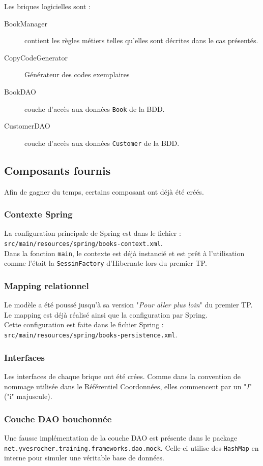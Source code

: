 \documentclass[small,algo]{dushClass}
\begin{document}
Les briques logicielles sont :
\begin{description}
\item[BookManager] contient les règles métiers telles qu'elles sont décrites dans le cas présentés.
\item[CopyCodeGenerator] Générateur des codes exemplaires
\item[BookDAO] couche d'accès aux données \texttt{Book} de la BDD.
\item[CustomerDAO] couche d'accès aux données \texttt{Customer} de la BDD.
\end{description}


\subsection{Composants fournis}
Afin de gagner du temps, certains composant ont déjà été créés.

\subsubsection{Contexte Spring}
La configuration principale de Spring est dans le fichier : \texttt{src/main/resources/spring/books-context.xml}.\\

Dans la fonction \texttt{main}, le contexte est déjà instancié et est prêt à l'utilisation comme l'était la \texttt{SessinFactory} d'Hibernate lors du premier TP.

\subsubsection{Mapping relationnel}
Le modèle a été poussé jusqu'à sa version "\emph{Pour aller plus loin}" du premier TP. Le mapping est déjà réalisé ainsi que la configuration par Spring.\\

Cette configuration est faite dans le fichier Spring : \texttt{src/main/resources/spring/books-persistence.xml}.

\subsubsection{Interfaces}
Les interfaces de chaque brique ont été crées. Comme dans la convention de nommage utilisée dans le Référentiel Coordonnées, elles commencent par un "\emph{I}" ("i" majuscule).


\subsubsection{Couche DAO bouchonnée}
Une fausse implémentation de la couche DAO est présente dans le package \texttt{net.yvesrocher.training.frameworks.dao.mock}. Celle-ci utilise des \texttt{HashMap} en interne pour simuler une véritable base de données.\\
\end{document}
